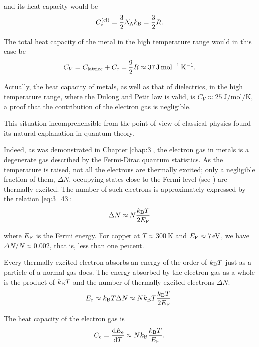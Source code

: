 \noindent
and its heat capacity would be
\begin{equation}\label{eq:4_40}
    C_{\text{e}}^{\text{(cl)}} = \frac{3}{2} N_{\text{A}} k_{\text{B}} = \frac{3}{2} R.
\end{equation}

\noindent
The total heat capacity of the metal in the high temperature range would in this case be
\begin{equation*}
    C_V = C_{\text{lattice}} + C_{\text{e}} = \frac{9}{2} R \approx \SI{37}{\joule\per\mole\per\kelvin}.
\end{equation*}

\noindent
Actually, the heat capacity of metals, as well as that of dielectrics, in the high temperature range, where the Dulong and Petit law is valid, is $C_V\approx\SI{25}{\joule\per\mole\per\kelvin}$, a proof that the contribution of the electron gas is negligible.

This situation incomprehensible from the point of view of classical physics found its natural explanation in quantum theory.

Indeed, as was demonstrated in Chapter \ref{chap:3}, the electron gas in metals is a degenerate gas described by the Fermi-Dirac quantum statistics. As the temperature is raised, not all the electrons are thermally excited; only a negligible fraction of them, $\Delta{N}$, occupying states close to the Fermi level (see ) are thermally excited. The number of such electrons is approximately expressed by the relation \eqref{eq:3_43}:
\begin{equation*}
    \Delta{N} \approx N \frac{k_{\text{B}} T}{2 E_{\text{F}}}
\end{equation*}

\noindent
where $E_{\text{F}}$ is the Fermi energy. For copper at $T\approx\SI{300}{\kelvin}$ and $E_{\text{F}}\approx\SI{7}{\electronvolt}$, we have $\Delta{N}/N\approx 0.002$, that is, less than one percent.

Every thermally excited electron absorbs an energy of the order of $k_{\text{B}}T$ just as a particle of a normal gas does. The energy absorbed by the electron gas as a whole is the product of $k_{\text{B}}T$ and the number of thermally excited electrons $\Delta{N}$:
\begin{equation}\label{eq:4_41}
    E_{\text{e}} \approx k_{\text{B}} T \Delta{N} \approx N k_{\text{B}} T \frac{k_{\text{B}} T}{2 E_{\text{F}}}.
\end{equation}

\noindent
The heat capacity of the electron gas is
\begin{equation}\label{eq:4_42}
    C_{\text{e}} = \dfrac{\mathrm{d}E_{\text{e}}}{\mathrm{d} T} \approx N k_{\text{B}} \frac{k_{\text{B}} T}{E_{\text{F}}}.
\end{equation}

